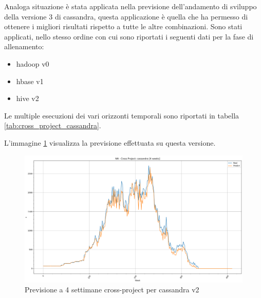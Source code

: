 \documentclass[%
    corpo=12pt,
    twoside,
    oldstyle,
    autoretitolo,
    greek,
    evenboxes,
]{toptesi}
\begin{document}
Analoga situazione è stata applicata nella previsione dell'andamento di sviluppo della versione 3 di cassandra, questa applicazione è quella che ha permesso di ottenere i migliori risultati rispetto a tutte le altre combinazioni. Sono stati applicati, nello stesso ordine con cui sono riportati i seguenti dati per la fase di allenamento:
\begin{itemize}
  \item hadoop v0
  \item hbase v1
  \item hive v2
\end{itemize}
Le multiple esecuzioni dei vari orizzonti temporali sono riportati in tabella \ref{tab:cross_project_cassandra}.
\begin{center}
   \label{tab:cross_project_cassandra}
\end{center}
L'immagine \ref{fig:cassandra_cp_nn_4w} visualizza la previsione effettuata su questa versione.
\begin{figure}[!ht]
  \includegraphics[width=\linewidth]{figure/NN-CP-cassandra-4.png}
  \caption{Previsione a 4 settimane cross-project per cassandra v2}
  \label{fig:cassandra_cp_nn_4w}
\end{figure}
\end{document}
